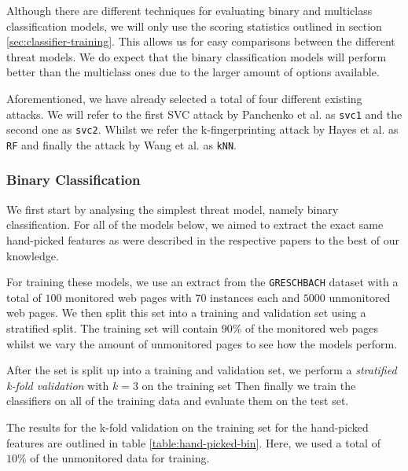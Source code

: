 Although there are different techniques for evaluating binary and multiclass classification models, we will only use the scoring statistics outlined in section \ref{sec:classifier-training}.
This allows us for easy comparisons between the different threat models.
We do expect that the binary classification models will perform better than the multiclass ones due to the larger amount of options available.

Aforementioned, we have already selected a total of four different existing attacks.
We will refer to the first SVC attack by Panchenko et al. \cite{panchenko1} as \texttt{svc1} and the second one \cite{panchenko2} as \texttt{svc2}.
Whilst we refer the k-fingerprinting attack by Hayes et al. \cite{kfingerprinting} as \texttt{RF} and finally the attack by Wang et al. \cite{wang_cai_johnson_nithyanand_goldberg_2014} as \texttt{kNN}.

\subsubsection{Binary Classification}

We first start by analysing the simplest threat model, namely binary classification.
For all of the models below, we aimed to extract the exact same hand-picked features as were described in the respective papers to the best of our knowledge.

For training these models, we use an extract from the \texttt{GRESCHBACH} dataset with a total of $100$ monitored web pages with $70$ instances each and $5000$ unmonitored web pages.
We then split this set into a training and validation set using a stratified split.
The training set will contain $90\%$ of the monitored web pages whilst we vary the amount of unmonitored pages to see how the models perform.

After the set is split up into a training and validation set, we perform a \textit{stratified k-fold validation} with $k = 3$ on the training set
Then finally we train the classifiers on all of the training data and evaluate them on the test set.

The results for the k-fold validation on the training set for the hand-picked features are outlined in table \ref{table:hand-picked-bin}.
Here, we used a total of $10\%$ of the unmonitored data for training.

